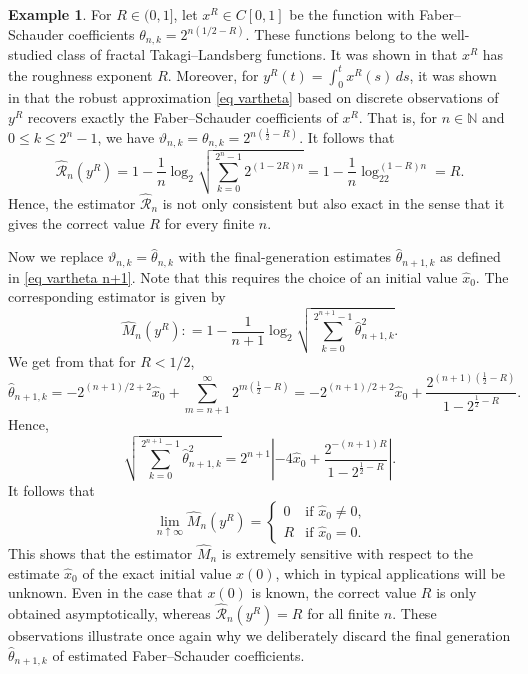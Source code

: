 \documentclass[12pt,reqno]{article}
\def\ua{\uparrow}
\def\wh{\widehat}
\numberwithin{equation}{section}
\def\cR{{\mathscr R}}
\theoremstyle{definition}
\newtheorem{example}[theorem]{Example}
\def\ua{\uparrow}
\def\wh{\widehat}
\newcommand{\bN}{\mathbb{N}}
\begin{document}
\begin{example}\label{Takagi example} For ${R}\in(0,1]$, let  $x^{R}\in C[0,1]$ be the function with Faber--Schauder coefficients $\theta_{n,k} = 2^{n(1/2-{R})}$. These functions belong to the well-studied class of fractal Takagi--Landsberg functions. It was shown in \cite[Theorem 2.1]{MishuraSchied2}  that $x^{R}$ has the roughness exponent ${R}$. Moreover, for $y^{R}(t) = \int_{0}^{t}x^{R}(s)\,ds$, it was shown in \cite[Example 2.3]{HanSchiedMatrix}  that the robust approximation \eqref{eq vartheta} based on discrete observations of $y^R$ recovers exactly the Faber--Schauder coefficients of $x^{R}$. That is, for $n \in \bN$ and  $0 \le k \le 2^n-1$, we have 
	$
	\vartheta_{n,k} = \theta_{n,k} = 2^{n(\frac{1}{2}-{R})}
	$.
	It follows that
		\begin{equation*}
	\wh\cR_n(y^R)=  1 - \frac{1}{n}\log_2\sqrt{\sum_{k = 0}^{2^{n}-1}2^{(1-2{R})n}} = 1 - \frac{1}{n}\log_22^{(1-{R})n} = {R}.
	\end{equation*}
	Hence, the estimator $\wh\cR_n$ is not only consistent but also exact in the sense that it gives the correct value ${R}$ for every finite $n$.

Now we replace $\vartheta_{n,k}=\wh\theta_{n,k}$ with the final-generation estimates $\wh\theta_{n+1,k}$ as defined in \eqref{eq vartheta n+1}. Note that this requires the choice of an initial value $\hat x_0$. The corresponding estimator is given by
\begin{equation*}
	\wh M_n(y^{R}): = 1 - \frac{1}{n+1}\log_2 \sqrt{\sum_{k = 0}^{2^{n+1}-1} \wh\theta_{n+1,k}^2}.
	\end{equation*}
We get from  \cite[Example 3.2]{HanSchiedMatrix} that for ${R}<1/2$,
	\begin{equation*}
	\wh\theta_{n+1,k} = -2^{(n+1)/2+2}\hat x_0 + \sum_{m = n+1}^{\infty} 2^{m(\frac{1}{2}-{R})} = -2^{(n+1)/2+2}\hat x_0+ \frac{2^{(n+1)(\frac{1}{2}-{R})}}{1 - 2^{\frac{1}{2}-{R}}}.
	\end{equation*}
Hence,
	\begin{equation*}
	\sqrt{\sum_{k = 0}^{2^{n+1}-1} \wh\theta_{n+1,k}^2 }= 2^{n+1}\left|-4\hat x_0+ \frac{2^{-(n+1){R}}}{1 - 2^{\frac{1}{2}-{R}}}\right| .	\end{equation*}
	It follows that
		$$\lim_{n \ua \infty} \wh M_n(y^{R})= \begin{cases}0&\text{if $\hat x_0\neq0$,}\\
	{R}&\text{if $\hat x_0=0$.}
	\end{cases}
$$  
This shows that the estimator $\wh M_n$ is extremely sensitive with respect to the estimate $\hat x_0$ of the exact initial value $x(0)$, which in typical applications will be unknown. Even in the case that $x(0)$ is  known, the correct value ${R}$ is only obtained asymptotically, whereas $\wh\cR_n(y^{R})={R}$ for all finite $n$. These observations illustrate once again why we deliberately discard the final generation $\wh\theta_{n+1,k}$ of estimated Faber--Schauder coefficients.

\end{example}
\end{document}
